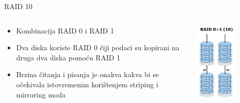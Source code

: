 \documentclass[croatian,t]{beamer} %
\begin{document}
    \begin{frame}{RAID 10}
    	\begin{columns}[c]
    		\begin{column}{6cm}
    			\begin{itemize}
    				\item Kombinacija RAID 0 i RAID 1
   					\item Dva diska koriste RAID 0 čiji podaci su kopirani na druga dva diska pomoću RAID 1
   					\item Brzina čitanja i pisanja je onakva kakva bi se očekivala istovremenim korištenjem striping i mirroring moda
    			\end{itemize}
    		\end{column}
    		\begin{column}{5cm}
    			\includegraphics[width=0.6\textwidth]{../pics/raid10.png}
    		\end{column}
    	\end{columns}
    \end{frame}
    
\end{document}
